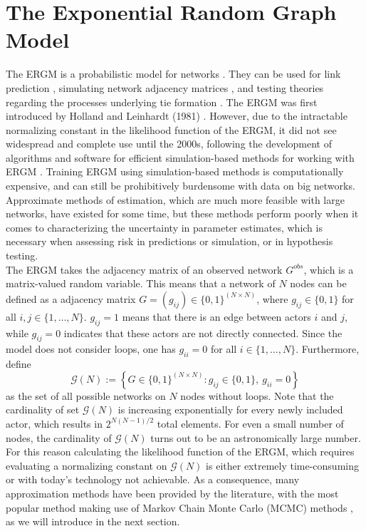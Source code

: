 \documentclass[10pt, conference, compsocconf]{IEEEtran}
\begin{document}
\section{The Exponential Random Graph Model}
The ERGM is a probabilistic model for networks \cite{chatterjee2013estimating,Wasserman.1996,robins.pattison.2007}. They can be used for link prediction \cite{lu2010supervised}, simulating network adjacency matrices \cite{hackney2006agent}, and testing theories regarding the processes underlying tie formation \cite{goodreau2009birds}. The ERGM was first introduced by Holland and Leinhardt (1981) \cite{holland1981exponential}. However, due to the intractable normalizing constant in the likelihood function of the ERGM, it did not see widespread and complete use until the 2000s, following the development of algorithms and software for efficient simulation-based methods for working with ERGM \cite{snijders2002markov}. Training ERGM using simulation-based methods is computationally expensive, and can still be prohibitively burdensome with data on big networks. Approximate methods of estimation, which are much more feasible with large networks, have existed for some time, but these methods perform poorly when it comes to characterizing the uncertainty in parameter estimates, which is necessary when assessing risk in predictions or simulation, or in hypothesis testing.\\
\indent The ERGM takes the adjacency matrix of an observed network $G^{obs}$, which is a matrix-valued random variable. This means that a network of $N$ nodes can be defined as a adjacency matrix $G=(g_{ij})\in \{0,1\}^{(N \times N)}$, where $g_{ij} \in \{0,1\}$ for all $i,j \in \{1,\dots , N\}$. $g_{ij}=1$ means that there is an edge between actors $i$ and $j$, while $g_{ij}=0$ indicates that these actors are not directly connected. Since the model does not consider loops, one has $g_{ii}=0$ for all $i \in \{1,\dots , N\}$. Furthermore, define
$$ \mathcal{G}(N) := \left\{ G \in \{0,1\}^{(N \times N)}: g_{ij} \in \{0,1\},~g_{ii}=0\right\}$$
as the set of all possible networks on $N$ nodes without loops. Note that the cardinality of set $\mathcal{G}(N)$ is increasing exponentially for every newly included actor, which results in $2^{N(N-1)/2}$ total elements. For even a small number of nodes, the cardinality of $\mathcal{G}(N)$ turns out to be an astronomically large number. For this reason calculating the likelihood function of the ERGM, which requires evaluating a normalizing constant on $\mathcal{G}(N)$  is either extremely time-consuming or with today's technology not achievable. As a consequence, many approximation methods have been provided by the literature, with the most popular method making use of Markov Chain Monte Carlo (MCMC) methods \cite{hunter2012computational}, as we will introduce in the next section.\\  
\end{document}
